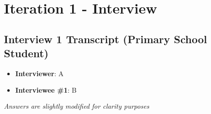 \section{Iteration 1 - Interview} \label{appendix:interview}

\subsection{Interview 1 Transcript (Primary School Student)}
  \begin{itemize}
    \item \textbf{Interviewer}: A
    \item \textbf{Interviewee \#1}: B
  \end{itemize}
  \par \textit{Answers are slightly modified for clarity purposes}

